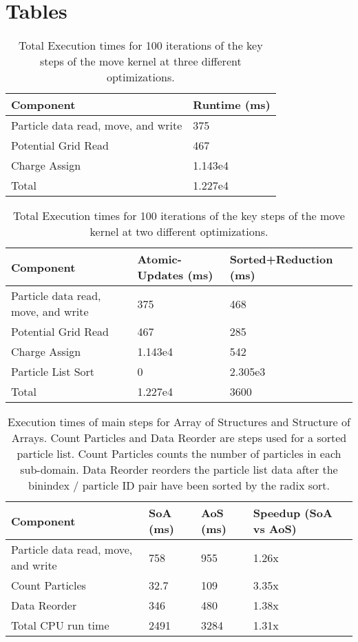 \chapter{Tables}

\begin{center}
\begin{table}
\begin{tabular}{| p{4.0cm} | p{3.5cm} |}
\hline
Component & Runtime (ms) \\ \hline
Particle data read, move, and write & 375 \\ \hline
Potential Grid Read & 467 \\ \hline
Charge Assign & 1.143e4  \\ \hline
Total & 1.227e4  \\ \hline
\end{tabular}
\caption{Total Execution times for 100 iterations of the key steps of the move kernel at three different optimizations.}
\label{tab:GPUPIC_basetime} 
\end{table}
\end{center}


\noindent \begin{table}
\begin{tabular}{| p{4.0cm} | p{3.5cm} | p{3.5cm} |}
\hline
Component & Atomic-Updates (ms) & Sorted+Reduction (ms) \\ \hline
Particle data read, move, and write & 375 & 468 \\ \hline
Potential Grid Read & 467 & 285 \\ \hline
Charge Assign & 1.143e4 & 542 \\ \hline
Particle List Sort & 0 & 2.305e3 \\ \hline
Total & 1.227e4 & 3600 \\ \hline
\end{tabular}
\caption{Total Execution times for 100 iterations of the key steps of the move kernel at two different optimizations.}
\label{tab:GPUPIC_comparison}
\end{table}

\noindent \begin{table}[h]
\begin{tabular}{| p{4.0cm} | p{3.5cm} | p{2.5cm} | p{4.0cm} |}
\hline
Component & SoA (ms) & AoS (ms) & Speedup (SoA vs AoS) \\ \hline
Particle data read, move, and write & 758 & 955 & 1.26x \\ \hline
Count Particles & 32.7 & 109 & 3.35x \\ \hline
Data Reorder & 346 & 480 & 1.38x \\ \hline
Total CPU run time & 2491 & 3284 & 1.31x \\ \hline
\end{tabular}
\caption{Execution times of main steps for Array of Structures and Structure of Arrays. Count Particles and Data Reorder are steps used for a sorted particle list. Count Particles counts the number of particles in each sub-domain. Data Reorder reorders the particle list data after the binindex / particle ID pair have been sorted by the radix sort.}
\label{tab:struct_compare} 
\end{table}


